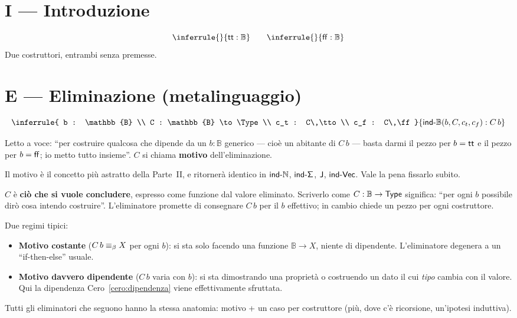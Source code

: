 \section*{I --- Introduzione}
\[
\inferrule{ }{\tto : \mathbb{B}}
\qquad
\inferrule{ }{\ff : \mathbb{B}}
\]
Due costruttori, entrambi senza premesse.

\section*{E --- Eliminazione (metalinguaggio)}
\[
\inferrule{
b : \mathbb{B} \\
C : \mathbb{B} \to \Type \\
c_t : C\,\tto \\
c_f : C\,\ff
}{
\indB(b, C, c_t, c_f) : C\,b
}
\]

Letto a voce: ``per costruire qualcosa che dipende da un $b : \mathbb{B}$ generico --- cio\`e un abitante di $C\,b$ --- basta darmi il pezzo per $b = \mathsf{tt}$ e il pezzo per $b = \mathsf{ff}$; io metto tutto insieme''. $C$ si chiama \textbf{motivo} dell'eliminazione.

\begin{oss}
Il motivo \`e il concetto pi\`u astratto della Parte~II, e ritorner\`a identico in $\mathsf{ind\text{-}\mathbb{N}}$, $\mathsf{ind\text{-}\Sigma}$, $\mathsf{J}$, $\mathsf{ind\text{-}Vec}$. Vale la pena fissarlo subito.

$C$ \`e \textbf{ci\`o che si vuole concludere}, espresso come funzione dal valore eliminato. Scriverlo come $C : \mathbb{B} \to \mathsf{Type}$ significa: ``per ogni $b$ possibile dir\`o cosa intendo costruire''. L'eliminatore promette di consegnare $C\,b$ per il $b$ effettivo; in cambio chiede un pezzo per ogni costruttore.

Due regimi tipici:
\begin{itemize}
\item \textbf{Motivo costante} ($C\,b \equiv_{\beta} X$ per ogni $b$): si sta solo facendo una funzione $\mathbb{B} \to X$, niente di dipendente. L'eliminatore degenera a un ``if-then-else'' usuale.
\item \textbf{Motivo davvero dipendente} ($C\,b$ varia con $b$): si sta dimostrando una propriet\`a o costruendo un dato il cui \emph{tipo} cambia con il valore. Qui la dipendenza Cero~\ref{cero:dipendenza} viene effettivamente sfruttata.
\end{itemize}
Tutti gli eliminatori che seguono hanno la stessa anatomia: motivo + un caso per costruttore (pi\`u, dove c'\`e ricorsione, un'ipotesi induttiva).
\end{oss}

